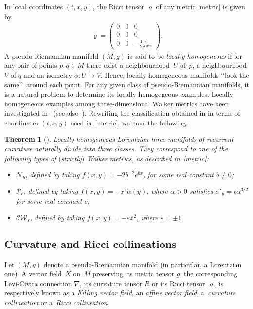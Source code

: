 \documentclass[10pt,a4paper]{amsart}
\numberwithin{equation}{section}
\newtheorem{Theorem}{Theorem}[section]
\begin{document}
In local coordinates $(t,x,y)$, the Ricci tensor $\varrho$ of any metric \eqref{metric} is given by
\begin{gather}\label{Ricci}
\varrho = \left( \begin{matrix}
0 & 0 & 0 \\
0 & 0 & 0 \\
0 & 0 & -\frac{1}{2} f_{xx}
\end{matrix} \right).
\end{gather}
A pseudo-Riemannian manifold $(M,g)$ is said to be {\em locally homogeneous} if for any pair of points $p,q \in M$ there exist a neighbourhood~$U$ of~$p$, a neighbourhood $V$ of $q$ and an isometry $\phi\colon U\to V$. Hence, locally homogeneous manifolds \lq\lq look the same\rq\rq \ around each point. For any given class of pseudo-Riemannian manifolds, it is a natural problem to determine its locally homogeneous examples. {Locally homogeneous} examples among three-dimensional Walker metrics have been investigated in~\cite{GGN} (see also~\cite{BCL}). Rewriting the classif\/ication obtained in \cite{GGN} in terms of coordinates $(t,x,y)$ used in~\eqref{metric}, we have the following.

\begin{Theorem}[\cite{GGN}]\label{homex}
Locally homogeneous Lorentzian three-manifolds of recurrent curvature naturally divide into three classes. They correspond to one of the following types of $($strictly$)$ Walker metrics, as described in~\eqref{metric}:
\begin{itemize}\itemsep=0pt
\item[$I)$] $\mathcal N _b$, defined by taking $f(x,y)=-2b^{-2}e^{bx}$, for some real constant $b \neq 0$;
\item[$II)$] $\mathcal P _c$, defined by taking $f(x,y)=-x^{2}\alpha (y)$, where $\alpha >0$ satisfies {$\alpha ' _y=c \alpha^{3/2}$} for some real constant $c$;
\item[$III)$] $\mathcal{CW} _{\varepsilon}$, defined by taking $f(x,y)=-\varepsilon x^2$, where $\varepsilon =\pm 1$.
\end{itemize}
\end{Theorem}

\subsection{Curvature and Ricci collineations}

Let $(M,g)$ denote a pseudo-Riemannian manifold (in particular, a Lorentzian one). A vector f\/ield~$X$ on~$M$ preserving its metric tensor $g$, the corresponding Levi-Civita connection $\nabla$, its curvature tensor $R$ or its Ricci tensor $\varrho$, is respectively known as a {\em Killing vector field}, an {\em affine vector field}, a~{\em curvature collineation} or a~{\em Ricci collineation}.
\end{document}
